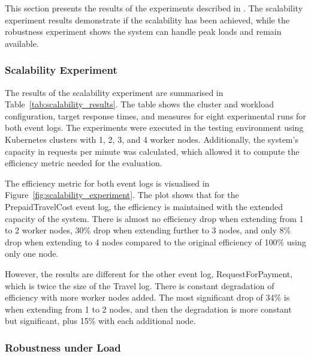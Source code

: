 \documentclass[12pt]{article}
\begin{document}
This section presents the results of the experiments described in . The scalability experiment results demonstrate if the scalability has been achieved, while the robustness experiment shows the system can handle peak loads and remain available.

\subsubsection{Scalability Experiment}

The results of the scalability experiment are summarised in Table~\ref{tab:scalability_results}. The table shows the cluster and workload configuration, target response times, and measures for eight experimental runs for both event logs. The experiments were executed in the testing environment using Kubernetes clusters with 1, 2, 3, and 4 worker nodes. Additionally, the system's capacity in requests per minute was calculated, which allowed it to compute the efficiency metric needed for the evaluation.

The efficiency metric for both event logs is visualised in Figure~\ref{fig:scalability_experiment}. The plot shows that for the PrepaidTravelCost event log, the efficiency is maintained with the extended capacity of the system. There is almost no efficiency drop when extending from 1 to 2 worker nodes, 30\% drop when extending further to 3 nodes, and only 8\% drop when extending to 4 nodes compared to the original efficiency of 100\% using only one node. 

However, the results are different for the other event log, RequestForPayment, which is twice the size of the Travel log. There is constant degradation of efficiency with more worker nodes added. The most significant drop of 34\% is when extending from 1 to 2 nodes, and then the degradation is more constant but significant, plus 15\% with each additional node.

\subsubsection{Robustness under Load}
\end{document}

